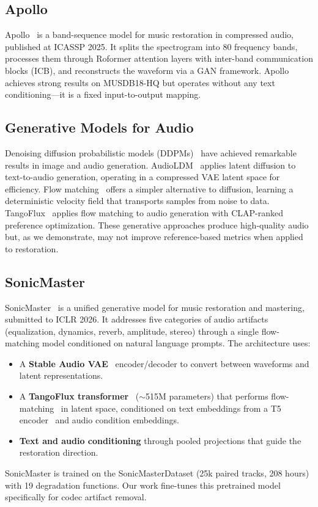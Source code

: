 \documentclass[conference]{IEEEtran}
\begin{document}
\subsection{Apollo}
Apollo~\cite{li2025apollo} is a band-sequence model for music restoration in
compressed audio, published at ICASSP 2025. It splits the spectrogram into 80
frequency bands, processes them through Roformer attention layers with
inter-band communication blocks (ICB), and reconstructs the waveform via a GAN
framework. Apollo achieves strong results on MUSDB18-HQ but operates without
any text conditioning---it is a fixed input-to-output mapping.

\subsection{Generative Models for Audio}
Denoising diffusion probabilistic models (DDPMs)~\cite{ho2020denoising}
have achieved remarkable results in image and audio generation. AudioLDM~\cite{liu2023audioldm} applies latent diffusion to text-to-audio
generation, operating in a compressed VAE latent space for efficiency.
Flow matching~\cite{lipman2023flow} offers a simpler alternative to
diffusion, learning a deterministic velocity field that transports samples
from noise to data. TangoFlux~\cite{ghosh2024tangoflux} applies flow matching
to audio generation with CLAP-ranked preference optimization. These
generative approaches produce high-quality audio but, as we demonstrate, may
not improve reference-based metrics when applied to restoration.

\subsection{SonicMaster}
SonicMaster~\cite{melechovsky2025sonicmaster} is a unified generative model
for music restoration and mastering, submitted to ICLR 2026. It addresses five
categories of audio artifacts (equalization, dynamics, reverb, amplitude,
stereo) through a single flow-matching model conditioned on natural language
prompts. The architecture uses:
\begin{itemize}
    \item A \textbf{Stable Audio VAE}~\cite{evans2024stable} encoder/decoder to
    convert between waveforms and latent representations.
    \item A \textbf{TangoFlux transformer}~\cite{ghosh2024tangoflux} ($\sim$515M
    parameters) that performs flow-matching~\cite{lipman2023flow} in latent
    space, conditioned on text embeddings from a T5
    encoder~\cite{raffel2020t5} and audio condition embeddings.
    \item \textbf{Text and audio conditioning} through pooled projections that
    guide the restoration direction.
\end{itemize}
SonicMaster is trained on the SonicMasterDataset (25k paired tracks, 208
hours) with 19 degradation functions. Our work fine-tunes this pretrained model
specifically for codec artifact removal.
\end{document}
